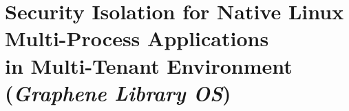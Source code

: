 
\chapter{Security Isolation for Native Linux Multi-Process Applications\\  in Multi-Tenant Environment\\ ({\em Graphene Library OS})}
\label{chap:graphene}









